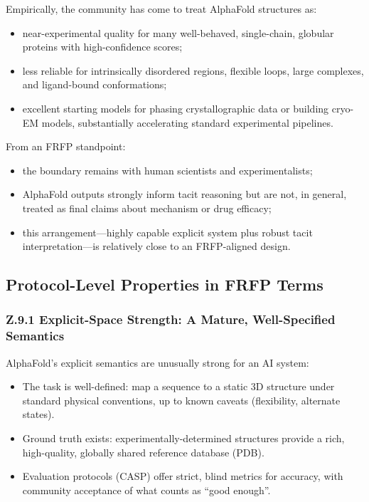 Empirically, the community has come to treat AlphaFold structures as:

\begin{itemize}
  \item near-experimental quality for many well-behaved, single-chain,
        globular proteins with high-confidence scores;
  \item less reliable for intrinsically disordered regions, flexible loops,
        large complexes, and ligand-bound conformations;
  \item excellent starting models for phasing crystallographic data or
        building cryo-EM models, substantially accelerating standard
        experimental pipelines.
\end{itemize}

From an FRFP standpoint:

\begin{itemize}
  \item the boundary remains with human scientists and experimentalists;
  \item AlphaFold outputs strongly inform tacit reasoning but are not, in
        general, treated as final claims about mechanism or drug efficacy;
  \item this arrangement---highly capable explicit system plus robust tacit
        interpretation---is relatively close to an FRFP-aligned design.
\end{itemize}

\subsection{Protocol-Level Properties in FRFP Terms}

\subsubsection*{Z.9.1 Explicit-Space Strength:
  A Mature, Well-Specified Semantics}

AlphaFold’s explicit semantics are unusually strong for an AI system:

\begin{itemize}
  \item The task is well-defined:
        map a sequence to a static 3D structure under standard physical
        conventions, up to known caveats (flexibility, alternate states).
  \item Ground truth exists:
        experimentally-determined structures provide a rich, high-quality,
        globally shared reference database (PDB).
  \item Evaluation protocols (CASP) offer strict, blind metrics for accuracy,
        with community acceptance of what counts as ``good enough''.
\end{itemize}

